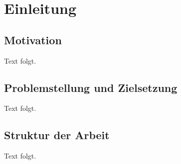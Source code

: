\chapter{Einleitung}

\section{Motivation}
Text folgt.

\section{Problemstellung und Zielsetzung}
Text folgt.

\section{Struktur der Arbeit}
Text folgt.
